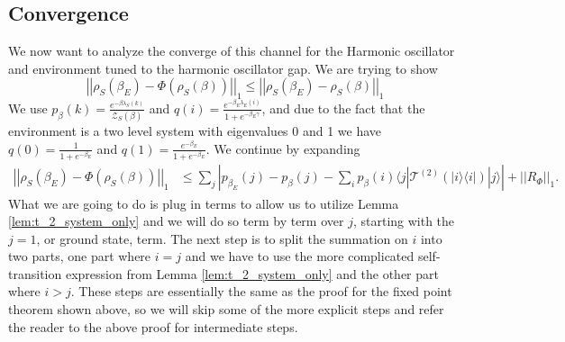 \documentclass{article}
\newcommand{\ket}[1]{|#1\rangle}
\newcommand{\bra}[1]{\langle #1|}
\newcommand{\ketbra}[2]{| #1\rangle\! \langle #2|}
\newcommand{\norm}[1]{\left| \left| #1 \right| \right|}
\newcommand{\partfun}{\mathcal{Z}}
\begin{document}
\subsection{Convergence}
We now want to analyze the converge of this channel for the Harmonic oscillator and environment tuned to the harmonic oscillator gap. We are trying to show
\begin{equation}
    \norm{\rho_S(\beta_E) - \Phi(\rho_S(\beta))}_1 \leq \norm{\rho_S(\beta_E) - \rho_S(\beta)}_1
\end{equation}
We use $p_{\beta}(k) = \frac{e^{-\beta \lambda_S(k)}}{\partfun_S(\beta)}$ and $q(i) = \frac{e^{-\beta_E \lambda_E(i)}}{1 + e^{-\beta_E \gamma}}$, and due to the fact that the environment is a two level system with eigenvalues 0 and 1 we have $q(0) = \frac{1}{1 + e^{-\beta_E}}$ and $q(1) = \frac{e^{-\beta_E}}{1 + e^{-\beta_E}}$.
We continue by expanding
\begin{align}
    \norm{\rho_S(\beta_E) - \Phi(\rho_S(\beta))}_1 &\leq \sum_j \left| p_{\beta_E}(j) - p_{\beta}(j) - \sum_i p_{\beta}(i) \bra{j}\mathcal{T}^{(2)}(\ketbra{i}{i})\ket{j} \right| + \norm{R_{\Phi}}_1.
\end{align}
What we are going to do is plug in terms to allow us to utilize Lemma \ref{lem:t_2_system_only} and we will do so term by term over $j$, starting with the $j=1$, or ground state, term. The next step is to split the summation on $i$ into two parts, one part where $i = j$ and we have to use the more complicated self-transition expression from Lemma \ref{lem:t_2_system_only} and the other part where $i > j$. These steps are essentially the same as the proof for the fixed point theorem shown above, so we will skip some of the more explicit steps and refer the reader to the above proof for intermediate steps.
\end{document}
